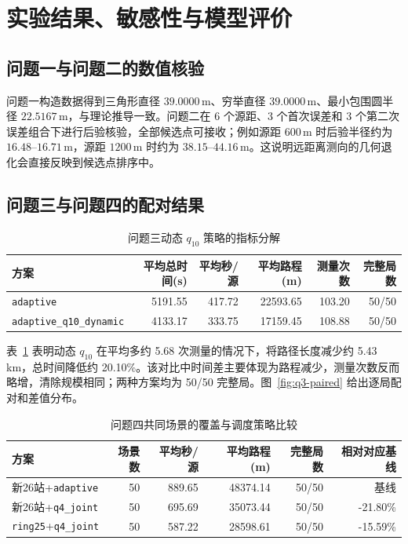 \section{实验结果、敏感性与模型评价}
\subsection{问题一与问题二的数值核验}
问题一构造数据得到三角形直径 $39.0000\,\mathrm m$、穷举直径 $39.0000\,\mathrm m$、最小包围圆半径 $22.5167\,\mathrm m$，与理论推导一致。问题二在 6 个源距、3 个首次误差和 3 个第二次误差组合下进行后验核验，全部候选点可接收；例如源距 $600\,\mathrm m$ 时后验半径约为 $16.48$--$16.71\,\mathrm m$，源距 $1200\,\mathrm m$ 时约为 $38.15$--$44.16\,\mathrm m$。这说明远距离测向的几何退化会直接反映到候选点排序中。

\subsection{问题三与问题四的配对结果}
\begin{table}[H]\centering\small
\caption{问题三动态 $q_{10}$ 策略的指标分解}\label{tab:q3-diagnostics}
\begin{tabular}{lrrrrr}
\toprule
方案 & 平均总时间(s) & 平均秒/源 & 平均路程(m) & 测量次数 & 完整局数 \\
\midrule
\texttt{adaptive} & 5191.55 & 417.72 & 22593.65 & 103.20 & 50/50 \\
\texttt{adaptive\_q10\_dynamic} & 4133.17 & 333.75 & 17159.45 & 108.88 & 50/50 \\
\bottomrule
\end{tabular}
\end{table}

表~\ref{tab:q3-diagnostics} 表明动态 $q_{10}$ 在平均多约 5.68 次测量的情况下，将路径长度减少约 5.43 km，总时间降低约 20.10\%。该对比中时间差主要体现为路程减少，测量次数反而略增，清除规模相同；两种方案均为 50/50 完整局。图~\ref{fig:q3-paired} 给出逐局配对和差值分布。

\begin{table}[H]\centering\small
\caption{问题四共同场景的覆盖与调度策略比较}\label{tab:q4-comparison}
\begin{tabular}{lrrrrr}
\toprule
方案 & 场景数 & 平均秒/源 & 平均路程(m) & 完整局数 & 相对对应基线 \\
\midrule
新26站+\texttt{adaptive} & 50 & 889.65 & 48374.14 & 50/50 & 基线 \\
新26站+\texttt{q4\_joint} & 50 & 695.69 & 35073.44 & 50/50 & -21.80\% \\
\texttt{ring25}+\texttt{q4\_joint} & 50 & 587.22 & 28598.61 & 50/50 & -15.59\% \\
\bottomrule
\end{tabular}
\end{table}

